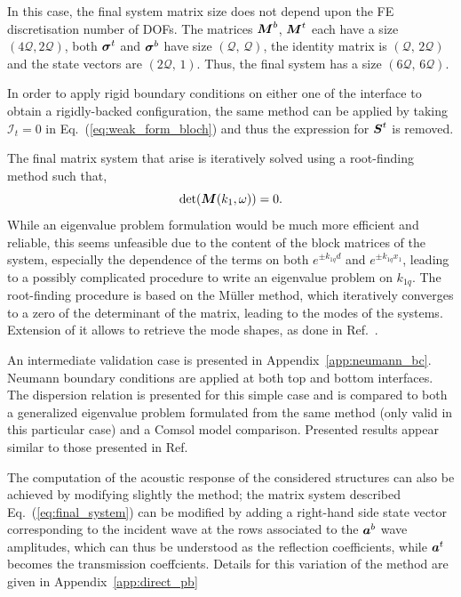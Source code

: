 In this case, the final system matrix size does not depend upon the FE discretisation number of DOFs. The matrices $\boldsymbol M^b$, $\boldsymbol M^t$ each have a size $(4\mathcal Q, 2\mathcal Q)$, both $\boldsymbol \sigma^t$ and $\boldsymbol \sigma^b$ have size $(\mathcal Q, \,\mathcal Q)$, the identity matrix is $(\mathcal Q, \,2\mathcal Q)$ and the state vectors are $(2\mathcal Q, \,1)$. Thus, the final system has a size $(6\mathcal Q, \,6\mathcal Q)$.

In order to apply rigid boundary conditions on either one of the interface to obtain a rigidly-backed configuration, the same method can be applied by taking $\mathcal I_t = 0$ in Eq.~(\ref{eq:weak_form_bloch}) and thus the expression for $\boldsymbol S^t$ is removed. 

The final matrix system that arise is iteratively solved using a root-finding method such that, 
\begin{equation}
    \mathrm{det}(\boldsymbol M(k_1, \omega)) = 0. 
    \label{eq:M_det}
\end{equation}
While an eigenvalue problem formulation would be much more efficient and reliable, this seems unfeasible due to the content of the block matrices of the system, especially the dependence of the terms on both $e^{\pm k_{1q}d}$ and $e^{\pm k_{1q}x_1}$, leading to a possibly complicated procedure to write an eigenvalue problem on $k_{1q}$. The root-finding procedure is based on the Müller method, which iteratively converges to a zero of the determinant of the matrix, leading to the modes of the systems. Extension of it allows to retrieve the mode shapes, as done in Ref.~\cite{marechal2025}.

An intermediate validation case is presented in Appendix~\ref{app:neumann_bc}. Neumann boundary conditions are applied at both top and bottom interfaces. The dispersion relation is presented for this simple case and is compared to both a generalized eigenvalue problem formulated from the same method (only valid in this particular case) and a Comsol model comparison. Presented results appear similar to those presented in Ref.~\cite{magliacano2020}

The computation of the acoustic response of the considered structures can also be achieved by modifying slightly the method; the matrix system described Eq.~(\ref{eq:final_system}) can be modified by adding a right-hand side state vector corresponding to the incident wave at the rows associated to the $\boldsymbol a^b$ wave amplitudes, which can thus be understood as the reflection coefficients, while $\boldsymbol a^t$ becomes the transmission coeffcients. Details for this variation of the method are given in Appendix~\ref{app:direct_pb}

